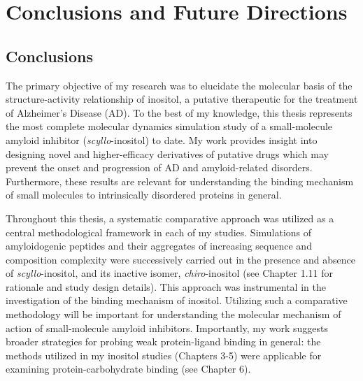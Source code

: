 

\chapter{Conclusions and Future Directions}
\section{Conclusions}

The primary objective of my research was to elucidate the molecular basis of the structure-activity relationship of inositol, a putative therapeutic for the treatment of Alzheimer's Disease (AD). To the best of my knowledge, this thesis represents the most complete molecular dynamics simulation study of a small-molecule amyloid inhibitor (\textit{scyllo}-inositol) to date. My work provides insight into designing novel and higher-efficacy derivatives of putative drugs which may prevent the onset and progression of AD and amyloid-related disorders.  Furthermore, these results are relevant for understanding the binding mechanism of small molecules to intrinsically disordered proteins in general.

Throughout this thesis, a systematic comparative approach was utilized as a central methodological framework in each of my studies. Simulations of amyloidogenic peptides and their aggregates of increasing sequence and composition complexity were successively carried out in the presence and absence of \emph{scyllo}-inositol, and its inactive isomer, \emph{chiro}-inositol (see Chapter 1.11 for rationale and study design details). This approach was instrumental in the investigation of the binding mechanism of inositol. Utilizing such a comparative methodology will be important for understanding the molecular mechanism of action of small-molecule amyloid inhibitors. Importantly, my work suggests broader strategies for probing weak protein-ligand binding in general: the methods utilized in my inositol studies (Chapters 3-5) were applicable for examining protein-carbohydrate binding (see Chapter 6).

